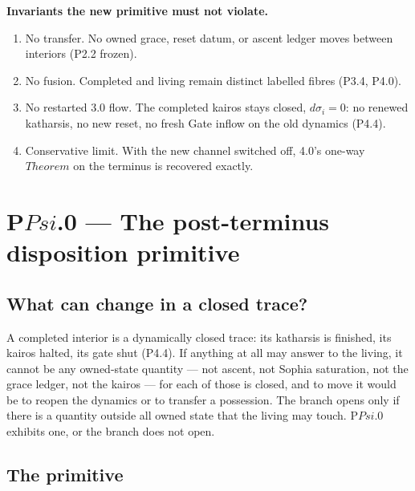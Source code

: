 \documentclass[11pt,a4paper]{article}
\def\Psi{Psi}%
\def\mathrm#1{#1}%
\def\emph#1{#1}%
\theoremstyle{definition}
\theoremstyle{plain}
\theoremstyle{remark}
\begin{document}
\noindent\textbf{Invariants the new primitive must not violate.}
\begin{enumerate}[label=\textup{(N\arabic*)},leftmargin=1.2cm]
\item \emph{No transfer.} No owned grace, reset datum, or ascent ledger moves between interiors
(P2.2 frozen).
\item \emph{No fusion.} Completed and living remain distinct labelled fibres (P3.4, P4.0).
\item \emph{No restarted 3.0 flow.} The completed kairos stays closed, \(d\sigma_i=0\): no
renewed katharsis, no new reset, no fresh Gate inflow on the old dynamics (P4.4).
\item \emph{Conservative limit.} With the new channel switched off, 4.0's one-way
\(\mathrm{Theorem}\) on the terminus is recovered exactly.
\end{enumerate}

\section{P$\Psi$.0 --- The post-terminus disposition primitive}

\subsection{What can change in a closed trace?}

A completed interior is a dynamically closed trace: its katharsis is finished, its kairos
halted, its gate shut (P4.4). If anything at all may answer to the living, it cannot be any
owned-state quantity --- not ascent, not Sophia saturation, not the grace ledger, not the
kairos --- for each of those is closed, and to move it would be to reopen the dynamics or to
transfer a possession. The branch opens only if there is a quantity \emph{outside} all owned
state that the living may touch. P$\Psi$.0 exhibits one, or the branch does not open.

\subsection{The primitive}
\end{document}
